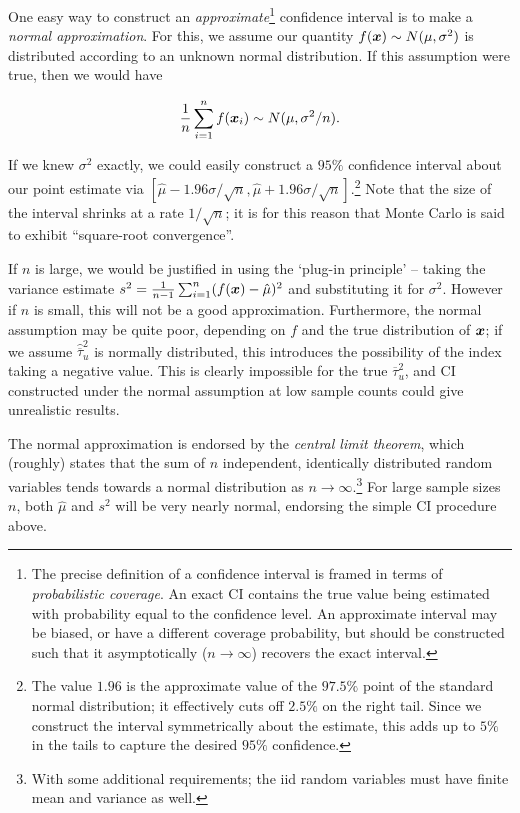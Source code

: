 \documentclass[../primer.tex]{subfiles}
\begin{document}
One easy way to construct an \emph{approximate}\footnote{The precise definition of a
confidence interval is framed in terms of \emph{probabilistic coverage}. An
exact CI contains the true value being estimated with probability equal to the
confidence level. An approximate interval may be biased, or have a different
coverage probability, but should be constructed such that it asymptotically
(\(n\to\infty\)) recovers the exact interval.} confidence interval is to make a
\emph{normal approximation}. For this, we assume our quantity \(f(\boldsymbol{x})\sim
N(\mu,\sigma^2)\) is distributed according to an unknown normal distribution. If
this assumption were true, then we would have

\begin{equation}\label{eq:est-dist}
  \frac{1}{n}\sum_{i=1}^n f(\boldsymbol{x}_i) \sim N(\mu,\sigma^2/n).
\end{equation}

\noindent If we knew \(\sigma^2\) exactly, we could easily construct a \(95\%\)
confidence interval about our point estimate via
\([\hat{\mu}-1.96\sigma/\sqrt{n},\hat{\mu}+1.96\sigma/\sqrt{n}]\).\footnote{The value
\(1.96\) is the approximate value of the \(97.5\%\) point of the standard normal
distribution; it effectively cuts off \(2.5\%\) on the right tail. Since we
construct the interval symmetrically about the estimate, this adds up to \(5\%\)
in the tails to capture the desired \(95\%\) confidence.} Note that the size of
the interval shrinks at a rate \(1/\sqrt{n}\); it is for this reason that Monte
Carlo is said to exhibit ``square-root convergence''.

If \(n\) is large, we would be justified in using the `plug-in principle' --
taking the variance estimate \(s^2=\frac{1}{n-1}\sum_{i=1}^n(f(\boldsymbol{x})-\hat{\mu})^2\)
and substituting it for \(\sigma^2\). However if \(n\) is small, this will not be a
good approximation. Furthermore, the normal assumption may be quite poor,
depending on \(f\) and the true distribution of \(\boldsymbol{x}\); if we assume
\(\hat{\overline{\tau}}_u^2\) is normally distributed, this introduces the
possibility of the index taking a negative value. This is clearly impossible for
the true \(\overline{\tau}_u^2\), and CI constructed under the normal assumption
at low sample counts could give unrealistic results.

The normal approximation is endorsed by the \emph{central limit theorem}, which
(roughly) states that the sum of \(n\) independent, identically distributed random
variables tends towards a normal distribution as \(n\to\infty\).\footnote{With some
additional requirements; the iid random variables must have finite mean and
variance as well.} For large sample sizes \(n\), both \(\hat{\mu}\) and \(s^2\) will
be very nearly normal, endorsing the simple CI procedure above.
\end{document}
